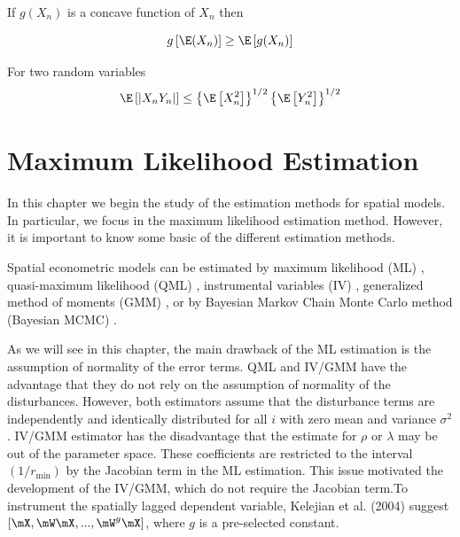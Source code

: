 \documentclass[english,12pt]{book}\usepackage[]{graphicx}\usepackage[]{xcolor}
\begin{document}
\begin{subappendices}
\begin{definition}\label{theorem:Jansen-Inequality}
If $g(X_n)$ is a concave function of $X_n$ then

\begin{equation*}
  g\left[\E(X_n)\right] \geq \E\left[g(X_n)\right]
\end{equation*}
\end{definition}

\begin{definition}\label{theorem:Cauchy-Inequality}
For two random variables
\begin{equation*}
  \E\left[\left|X_nY_n\right|\right]\leq \left\lbrace \E\left[X_n^2\right]\right\rbrace^{1/2} \left\lbrace \E\left[Y_n^2\right]\right\rbrace^{1/2} 
\end{equation*}
\end{definition}


\end{subappendices}


\chapter{Maximum Likelihood Estimation}\label{chap:ML}

In this chapter we begin the study of the estimation methods for spatial models. In particular, we focus in the maximum likelihood estimation method. However, it is important to know some basic of the different estimation methods. 

Spatial econometric models can be estimated by maximum likelihood (ML) \citep{ord1975estimation}, quasi-maximum likelihood (QML) \citep{lee2004asymptotic}, instrumental variables (IV) \citep[][pp. 82-86]{anselin1988spatial}, generalized method of moments (GMM) \citep{kelejian1998generalized, kelejian1999generalized}, or by Bayesian Markov Chain Monte Carlo method (Bayesian MCMC) \citep{lesage1997bayesian}.

As we will see in this chapter, the main drawback of the ML estimation is the assumption of normality of the error terms. QML and IV/GMM have the advantage that they do not rely on the assumption of normality of the disturbances. However, both estimators assume that the disturbance terms are independently and identically distributed for all $i$ with zero mean and variance $\sigma^2$.  IV/GMM estimator has the disadvantage that the estimate for $\rho$ or $\lambda$ may be out of the parameter space. These coefficients are restricted to the interval $(1/r_{\mbox{min}})$ by the Jacobian term in the ML estimation. This issue motivated the development of the IV/GMM, which do not require the Jacobian term.To instrument the spatially lagged dependent variable, Kelejian et al. (2004) suggest $\left[\mX, \mW\mX,...,\mW^g\mX\right]$, where $g$ is a pre-selected constant. 
\end{document}
